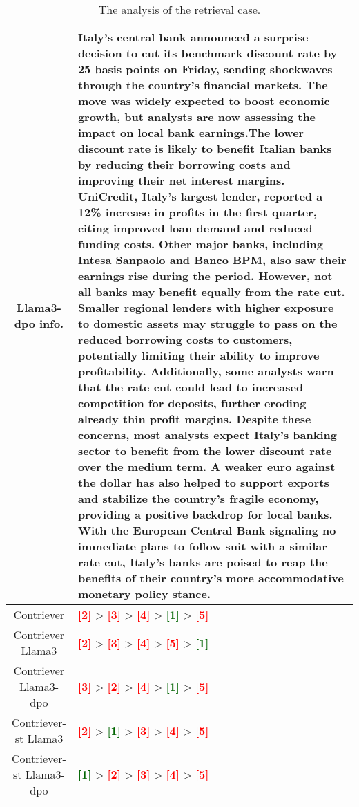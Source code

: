 \begin{table*}[ht]
\begin{tabularx}{\textwidth}{c|X}
        Llama3-dpo info. & Italy's central bank announced a surprise decision to cut its benchmark discount rate by 25 basis points on Friday, sending shockwaves through the country's financial markets. The move was widely expected to boost economic growth, but analysts are now assessing the impact on local bank earnings.The lower discount rate is likely to benefit Italian banks by reducing their borrowing costs and improving their net interest margins. UniCredit, Italy's largest lender, reported a 12\% increase in profits in the first quarter, citing improved loan demand and reduced funding costs. Other major banks, including Intesa Sanpaolo and Banco BPM, also saw their earnings rise during the period.\newline
        However, not all banks may benefit equally from the rate cut. Smaller regional lenders with higher exposure to domestic assets may struggle to pass on the reduced borrowing costs to customers, potentially limiting their ability to improve profitability. Additionally, some analysts warn that the rate cut could lead to increased competition for deposits, further eroding already thin profit margins.\newline
        Despite these concerns, most analysts expect Italy's banking sector to benefit from the lower discount rate over the medium term. A weaker euro against the dollar has also helped to support exports and stabilize the country's fragile economy, providing a positive backdrop for local banks. With the European Central Bank signaling no immediate plans to follow suit with a similar rate cut, Italy's banks are poised to reap the benefits of their country's more accommodative monetary policy stance. \\
        \midrule \midrule
        Contriever & \textbf{\textcolor{red}{[2]}} > \textbf{\textcolor{red}{[3]}} > \textbf{\textcolor{red}{[4]}} > \textbf{\textcolor{darkgreen}{[1]}} > \textbf{\textcolor{red}{[5]}} \\ \midrule
        Contriever \textbullet{} Llama3 & \textbf{\textcolor{red}{[2]}} > \textbf{\textcolor{red}{[3]}} > \textbf{\textcolor{red}{[4]}} > \textbf{\textcolor{red}{[5]}} > \textbf{\textcolor{darkgreen}{[1]}} \\ \midrule
        Contriever \textbullet{} Llama3-dpo & \textbf{\textcolor{red}{[3]}} > \textbf{\textcolor{red}{[2]}} > \textbf{\textcolor{red}{[4]}} > \textbf{\textcolor{darkgreen}{[1]}} > \textbf{\textcolor{red}{[5]}} \\ \midrule
        Contriever-st \textbullet{} Llama3 & \textbf{\textcolor{red}{[2]}} > \textbf{\textcolor{darkgreen}{[1]}} > \textbf{\textcolor{red}{[3]}} > \textbf{\textcolor{red}{[4]}} > \textbf{\textcolor{red}{[5]}} \\ \midrule
        Contriever-st \textbullet{} Llama3-dpo & \textbf{\textcolor{darkgreen}{[1]}} > \textbf{\textcolor{red}{[2]}} > \textbf{\textcolor{red}{[3]}} > \textbf{\textcolor{red}{[4]}} > \textbf{\textcolor{red}{[5]}} \\
        \bottomrule
    \end{tabularx}
    \label{case2}
    \caption{The analysis of the retrieval case.}
\end{table*}